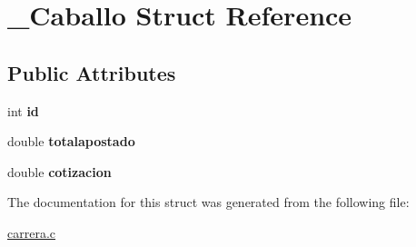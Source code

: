 \hypertarget{struct__Caballo}{}\section{\+\_\+\+Caballo Struct Reference}
\label{struct__Caballo}
\subsection*{Public Attributes}
\begin{DoxyCompactItemize}
\item 
int {\bfseries id}\hypertarget{struct__Caballo_a233e3c2f3372a27dcff1e4161cbb9ff4}{}\label{struct__Caballo_a233e3c2f3372a27dcff1e4161cbb9ff4}

\item 
double {\bfseries totalapostado}\hypertarget{struct__Caballo_ac18791b370ba0dfbf8bb29554e701cb3}{}\label{struct__Caballo_ac18791b370ba0dfbf8bb29554e701cb3}

\item 
double {\bfseries cotizacion}\hypertarget{struct__Caballo_a69f38b3e2d3718a80b71b5384ab7ffb8}{}\label{struct__Caballo_a69f38b3e2d3718a80b71b5384ab7ffb8}

\end{DoxyCompactItemize}


The documentation for this struct was generated from the following file\+:\begin{DoxyCompactItemize}
\item 
\hyperlink{carrera_8c}{carrera.\+c}\end{DoxyCompactItemize}
